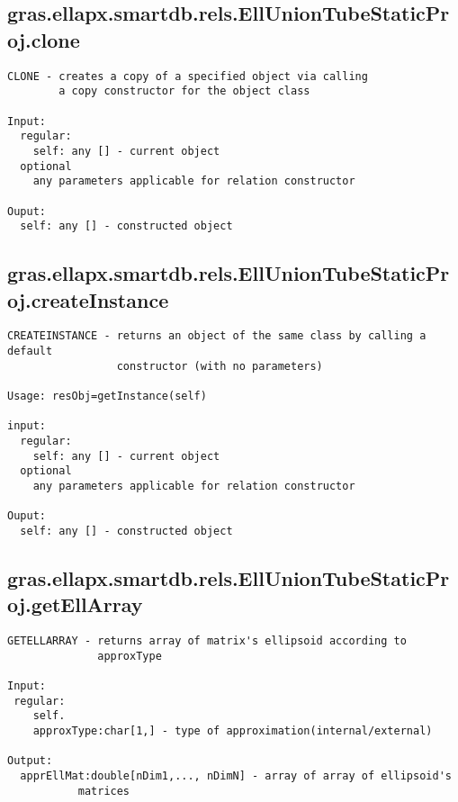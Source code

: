 \subsection{\texorpdfstring{gras.ellapx.smartdb.rels.EllUnionTubeStaticProj.clone}{clone}}\label{method:gras.ellapx.smartdb.rels.EllUnionTubeStaticProj.clone}
\begin{verbatim}
CLONE - creates a copy of a specified object via calling
        a copy constructor for the object class

Input:
  regular:
    self: any [] - current object
  optional
    any parameters applicable for relation constructor

Ouput:
  self: any [] - constructed object
\end{verbatim}
\subsection{\texorpdfstring{gras.ellapx.smartdb.rels.EllUnionTubeStaticProj.createInstance}{createInstance}}\label{method:gras.ellapx.smartdb.rels.EllUnionTubeStaticProj.createInstance}
\begin{verbatim}
CREATEINSTANCE - returns an object of the same class by calling a default
                 constructor (with no parameters)

Usage: resObj=getInstance(self)

input:
  regular:
    self: any [] - current object
  optional
    any parameters applicable for relation constructor

Ouput:
  self: any [] - constructed object
\end{verbatim}
\subsection{\texorpdfstring{gras.ellapx.smartdb.rels.EllUnionTubeStaticProj.getEllArray}{getEllArray}}\label{method:gras.ellapx.smartdb.rels.EllUnionTubeStaticProj.getEllArray}
\begin{verbatim}
GETELLARRAY - returns array of matrix's ellipsoid according to
              approxType

Input:
 regular:
    self.
    approxType:char[1,] - type of approximation(internal/external)

Output:
  apprEllMat:double[nDim1,..., nDimN] - array of array of ellipsoid's
           matrices
\end{verbatim}
